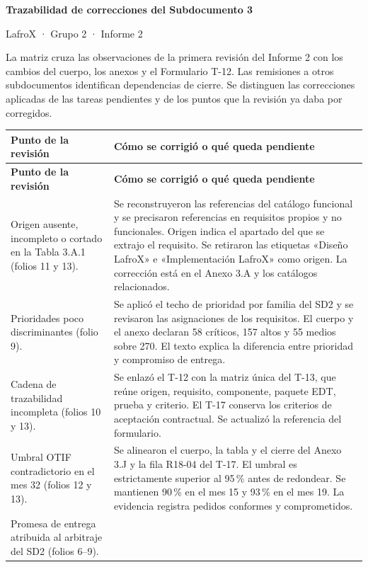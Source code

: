 \documentclass[11pt,letterpaper]{article}
\begin{document}
\begin{center}
  {\Large\bfseries Trazabilidad de correcciones del Subdocumento 3}\par
  LafroX · Grupo 2 · Informe 2
\end{center}

La matriz cruza las observaciones de la primera revisión del Informe 2 con los cambios del cuerpo, los anexos y el Formulario T-12. Las remisiones a otros subdocumentos identifican dependencias de cierre. Se distinguen las correcciones aplicadas de las tareas pendientes y de los puntos que la revisión ya daba por corregidos.

\begin{longtable}{@{}P{0.33\textwidth}P{\tabcolsep\relax}@{}}
\hline
\textbf{Punto de la revisión} & \textbf{Cómo se corrigió o qué queda pendiente} \\
\hline
\endfirsthead
\hline
\textbf{Punto de la revisión} & \textbf{Cómo se corrigió o qué queda pendiente} \\
\hline
\endhead
\hline
\endfoot
Origen ausente, incompleto o cortado en la Tabla 3.A.1 (folios 11 y 13). &
Se reconstruyeron las referencias del catálogo funcional y se precisaron referencias en requisitos propios y no funcionales. Origen indica el apartado del que se extrajo el requisito. Se retiraron las etiquetas «Diseño LafroX» e «Implementación LafroX» como origen. La corrección está en el Anexo 3.A y los catálogos relacionados. \\
Prioridades poco discriminantes (folio 9). &
Se aplicó el techo de prioridad por familia del SD2 y se revisaron las asignaciones de los requisitos. El cuerpo y el anexo declaran 58 críticos, 157 altos y 55 medios sobre 270. El texto explica la diferencia entre prioridad y compromiso de entrega. \\
Cadena de trazabilidad incompleta (folios 10 y 13). &
Se enlazó el T-12 con la matriz única del T-13, que reúne origen, requisito, componente, paquete EDT, prueba y criterio. El T-17 conserva los criterios de aceptación contractual. Se actualizó la referencia del formulario. \\
Umbral OTIF contradictorio en el mes 32 (folios 12 y 13). &
Se alinearon el cuerpo, la tabla y el cierre del Anexo 3.J y la fila R18-04 del T-17. El umbral es estrictamente superior al 95\,\% antes de redondear. Se mantienen 90\,\% en el mes 15 y 93\,\% en el mes 19. La evidencia registra pedidos conformes y comprometidos. \\
Promesa de entrega atribuida al arbitraje del SD2 (folios 6--9). &

\end{longtable}
\end{document}

